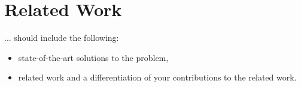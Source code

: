 \chapter{Related Work\label{cha:chapter5}}
... should include the following:
\begin{itemize}

\item state-of-the-art solutions to the problem,
\item related work and a differentiation of your contributions to the related work.

\end{itemize}



    
